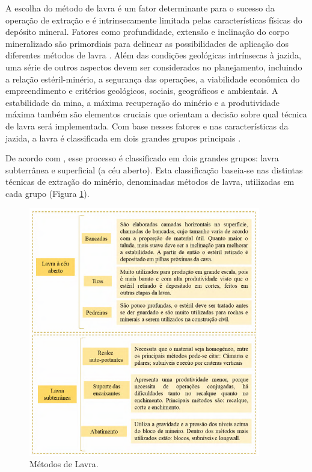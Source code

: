 A escolha do método de lavra é um fator determinante para o sucesso da operação de extração e é intrinsecamente limitada pelas características físicas do depósito mineral. Fatores como profundidade, extensão e inclinação do corpo mineralizado são primordiais para delinear as possibilidades de aplicação dos diferentes métodos de lavra \cite{carvalho2018}. Além das condições geológicas intrínsecas à jazida, uma série de outros aspectos devem ser considerados no planejamento, incluindo a relação estéril-minério, a segurança das operações, a viabilidade econômica do empreendimento e critérios geológicos, sociais, geográficos e ambientais. A estabilidade da mina, a máxima recuperação do minério e a produtividade máxima também são elementos cruciais que orientam a decisão sobre qual técnica de lavra será implementada. Com base nesses fatores e nas características da jazida, a lavra é classificada em dois grandes grupos principais \cite{carvalho2018, jr2019}.

De acordo com \cite{jr2019}, esse processo é classificado em dois grandes grupos: lavra subterrânea e superficial (a céu aberto). Esta classificação baseia-se nas distintas técnicas de extração do minério, denominadas métodos de lavra, utilizadas em cada grupo (Figura \ref{fig:metodos_lavra}).

\begin{figure}[!htb]
    \centering
    \includegraphics[width=0.9\textwidth]{figures/image15_metodos_lavra.png}
    \caption{Métodos de Lavra.}
    \label{fig:metodos_lavra}
\end{figure}

